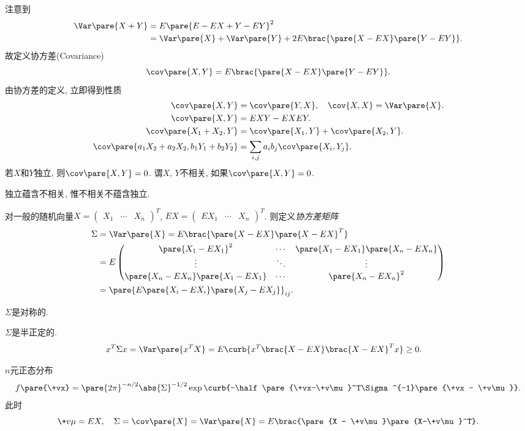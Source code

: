 \documentclass[../Statistics.tex]{subfiles}
\begin{document}
注意到
\begin{align*}
    \Var\pare{X+Y} &= E\pare{E-EX+Y-EY}^2\\ &= \Var\pare{X} + \Var\pare{Y} + 2E\brac{\pare{X-EX}\pare{Y-EY}}.
\end{align*}
故定义协方差(Covariance)
\[ \cov\pare{X,Y} = E\brac{\pare{X-EX}\pare{Y-EY}}. \]
由协方差的定义, 立即得到性质
\begin{align*}
    \cov\pare{X,Y} &= \cov\pare{Y,X},\quad \cov{X,X} = \Var\pare{X}. \\
    \cov\pare{X,Y} &= EXY - EXEY. \\
    \cov\pare{X_1 + X_2, Y} &= \cov\pare{X_1,Y} + \cov\pare{X_2,Y}. \\
    \cov\pare{a_1X_2 + a_2X_2, b_1Y_1 + b_2Y_2} &= \sum_{i,j} a_ib_j\cov\pare{X_i,Y_j}.
\end{align*}
若$X$和$Y$独立, 则$\cov\pare{X,Y}= 0$. 谓$X$, $Y$不相关, 如果$\cov\pare{X,Y} = 0$.
\begin{pitfall}
    独立蕴含不相关, 惟不相关不蕴含独立.
\end{pitfall}
对一般的随机向量$X = \begin{pmatrix}
    X_1  & \cdots & X_n
\end{pmatrix}^T$, $EX = \begin{pmatrix}
    EX_1 & \cdots & X_n
\end{pmatrix}^T$. 则定义\emph{协方差矩阵}
\begin{align*}
    \Sigma &= \Var\pare{X} = E\brac{\pare{X-EX}\pare{X-EX}^T} \\
    &= E \begin{pmatrix}
    \pare{X_1 - EX_1}^2 & \cdots & \pare{X_1 - EX_1} \pare{X_n - EX_n} \\
    \vdots & \ddots & \vdots \\
    \pare{X_n-EX_n}\pare{X_1 - EX_1} & \cdots & \pare{X_n - EX_n}^2
    \end{pmatrix} \\
    &= \pare{E\pare{X_i - EX_i}\pare{X_j - EX_j}}_{ij}.
\end{align*}
\begin{cenum}
    \item $\Sigma$是对称的.
    \item $\Sigma$是半正定的.
    \begin{align*}
        x^T \Sigma x &= \Var\pare{x^T X} = E\curb{x^T\brac{X-EX}\brac{X-EX}^T x} \ge 0.
    \end{align*}
\end{cenum}
\begin{sample}
    \begin{ex}
        $n$元正态分布
        \[ f\pare{\+vx} = \pare{2\pi}^{-n/2}\abs{\Sigma}^{-1/2} \exp\curb{-\half \pare{\+vx-\+v\mu}^T\Sigma^{-1}\pare{\+vx - \+v\mu}}. \]
        此时
        \[ \+v\mu = EX,\quad \Sigma = \cov\pare{X} = \Var\pare{X} = E\brac{\pare{X - \+v\mu}\pare{X-\+v\mu}^T}. \]
    \end{ex}
\end{sample}
\end{document}
